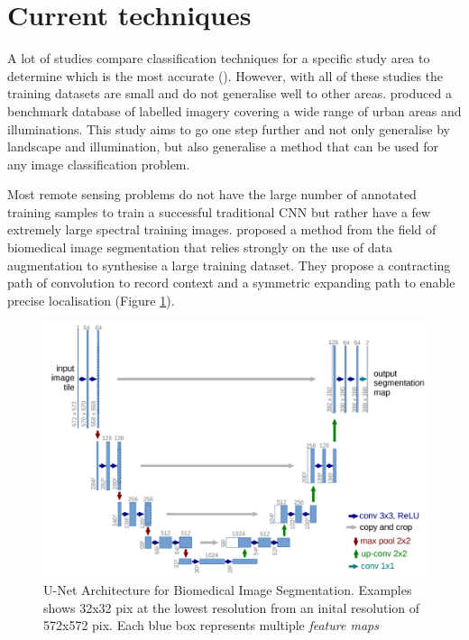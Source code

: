 \section*{Current techniques}
A lot of studies compare classification techniques for a specific study area to determine which is the most accurate (\cite{fauvel12,mnih13,volpi17}). However, with all of these studies the training datasets are small and do not generalise well to other areas. \citet{maggiori17a} produced a benchmark database of labelled imagery covering a wide range of urban areas and illuminations. This study aims to go one step further and not only generalise by landscape and illumination, but also generalise a method that can be used for any image classification problem.
\par
Most remote sensing problems do not have the large number of annotated training samples to train a successful traditional CNN but rather have a few extremely large spectral training images. \citet{ronneberger15} proposed a method from the field of biomedical image segmentation that relies strongly on the use of data augmentation to synthesise a large training dataset. They propose a contracting path of convolution to record context and a symmetric expanding path to enable precise localisation (Figure \ref{fig.U_NET}).
\begin{figure}[htbp]
    \centering
    \includegraphics[width=\textwidth]{Part2/chapter3/chapter/figs/unet_arch.PNG}
    \caption[U-Net Architecture for Biomedical Image Segmentation]{U-Net Architecture for Biomedical Image Segmentation. Examples shows 32x32 pix at the lowest resolution from an inital resolution of 572x572 pix. Each blue box represents multiple \textit{feature maps} }
    \label{fig.U_NET}
\end{figure}
